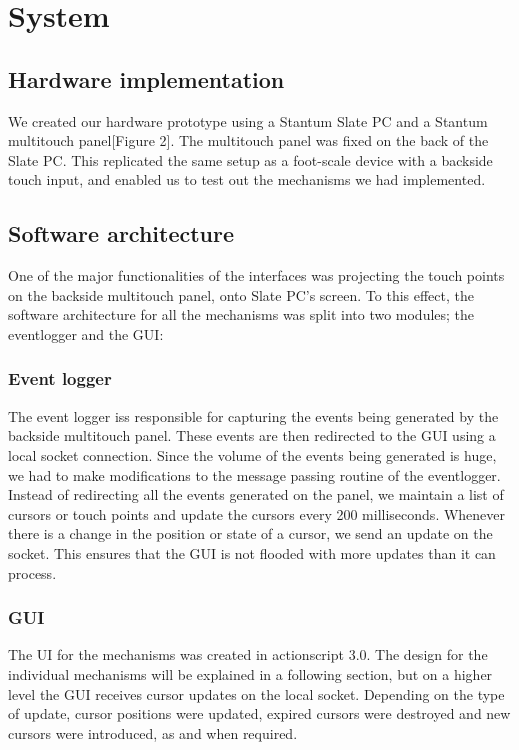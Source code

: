 \section{System}

\subsection{Hardware implementation}

We created our hardware prototype using a Stantum Slate PC and a Stantum
multitouch panel[Figure 2]. The multitouch panel was fixed on the back
of the Slate PC. This replicated the same setup as a foot-scale device
with a backside touch input, and enabled us to test out the mechanisms
we had implemented.

\subsection{Software architecture}

One of the major functionalities of the interfaces was projecting the
touch points on the backside multitouch panel, onto Slate PC's
screen. To this effect, the software architecture for all the
mechanisms was split into two modules; the eventlogger and the GUI:

\subsubsection{Event logger}

The event logger iss responsible for capturing the events being
generated by the backside multitouch panel. These events are then
redirected to the GUI using a local socket connection. Since the
volume of the events being generated is huge, we had to make
modifications to the message passing routine of the
eventlogger. Instead of redirecting all the events generated on the
panel, we maintain a list of cursors or touch points and update the
cursors every 200 milliseconds. Whenever there is a change in the
position or state of a cursor, we send an update on the socket. This
ensures that the GUI is not flooded with more updates than it can
process.

\subsubsection{GUI}

The UI for the mechanisms was created in actionscript 3.0. The design
for the individual mechanisms will be explained in a following
section, but on a higher level the GUI receives cursor updates on the
local socket. Depending on the type of update, cursor positions were
updated, expired cursors were destroyed and new cursors were
introduced, as and when required.
